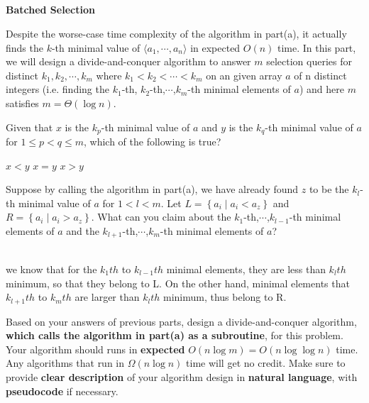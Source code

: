 \begin{parts}
  \newpage

  \part{} \textbf{Batched Selection} \par

  Despite the worse-case time complexity of the algorithm in part(a), it actually finds the $k$-th minimal value of \(\langle a_1,\cdots,a_n\rangle\) in expected $O(n)$ time. In this part, we will design a divide-and-conquer algorithm to answer $m$ selection queries for distinct $k_1, k_2, \cdots, k_m$ where $k_1 < k_2 < \cdots < k_m$ on an given array $a$ of n distinct integers (i.e. finding the $k_1$-th, $k_2$-th,$\cdots$,$k_m$-th minimal elements of $a$) and here $m$ satisfies $m = \Theta(\log n)$.

  \begin{subparts}
    \subpart[1] Given that $x$ is the $k_p$-th minimal value of $a$ and $y$ is the $k_q$-th minimal value of $a$ for $1 \leq p < q \leq m$, which of the following is true?

    \begin{oneparcheckboxes}
      \CorrectChoice $x < y$
      \choice $x = y$
      \choice $x > y$
    \end{oneparcheckboxes}



    \subpart[2] Suppose by calling the algorithm in part(a), we have already found $z$ to be the $k_l$-th minimal value of $a$ for $1 < l < m$. Let $L = \left\{a_i \mid a_i < a_z\right\}$ and $R = \left\{a_i \mid a_i > a_z\right\}$. What can you claim about the $k_1$-th,$\cdots$,$k_{l-1}$-th minimal elements of $a$ and the $k_{l+1}$-th,$\cdots$,$k_{m}$-th minimal elements of $a$?

    \begin{solution} \\
      we know that for the $k_1th$ to $k_{l-1}th$ minimal elements, they are less than $k_lth$ minimum, so that they belong
      to L. On the other hand, minimal elements that $k_{l+1}th$ to $k_mth$ are larger than $k_lth$ minimum, thus belong to R.
    \end{solution}

    \subpart[6] Based on your answers of previous parts, design a divide-and-conquer algorithm, \textbf{which calls the algorithm in part(a) as a subroutine}, for this problem. Your algorithm should runs in \textbf{expected} $O(n \log m) = O(n \log \log n)$ time. Any algorithms that run in $\Omega(n \log n)$ time will get no credit. Make sure to provide \textbf{clear description} of your algorithm design in \textbf{natural language}, with \textbf{pseudocode} if necessary.


\end{subparts}
\end{parts}
